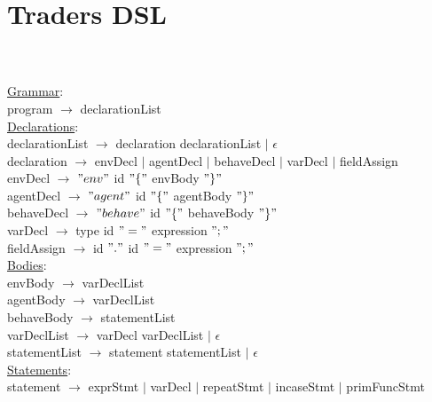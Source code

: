\documentclass{article}
\begin{document}
\chapter{Traders DSL}\\ \\

\underline{Grammar}: \\

program $\rightarrow$ declarationList \\

\underline{Declarations}: \\

declarationList $\rightarrow$ declaration declarationList  $\vert$ $\epsilon$ \\

declaration $\rightarrow$ envDecl $\vert$ agentDecl $\vert$ behaveDecl $\vert$ varDecl $\vert$ fieldAssign\\

envDecl $\rightarrow$ $"env"$ id $"\{"$ envBody $"\}"$ \\

agentDecl $\rightarrow$ $"agent"$ id $"\{"$ agentBody $"\}"$ \\

behaveDecl $\rightarrow$ $"behave"$ id $"\{"$ behaveBody $"\}"$ \\

varDecl $\rightarrow$ type id $"="$ expression $";"$ \\

fieldAssign $\rightarrow$ id $"."$ id $"="$ expression $";"$ \\

\underline{Bodies}: \\

envBody $\rightarrow$ varDeclList \\

agentBody $\rightarrow$ varDeclList \\

behaveBody $\rightarrow$ statementList \\

varDeclList $\rightarrow$ varDecl varDeclList $\vert$ $\epsilon$ \\

statementList $\rightarrow$ statement statementList $\vert$ $\epsilon$ \\

\underline{Statements}: \\

statement $\rightarrow$ exprStmt $\vert$ varDecl $\vert$ repeatStmt $\vert$ incaseStmt $\vert$ primFuncStmt \\
\end{document}
